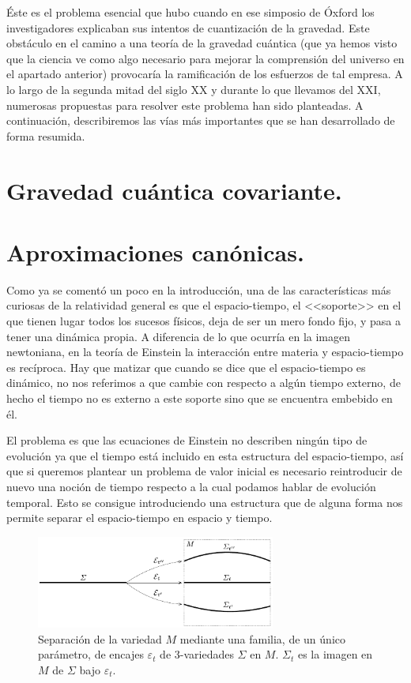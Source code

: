 \documentclass[11pt,a4paper,titlepage]{article}
\begin{document}
Éste es el problema esencial que hubo cuando en ese simposio de Óxford los investigadores explicaban sus intentos de cuantización de la gravedad. Este obstáculo en el camino a una teoría de la gravedad cuántica (que ya hemos visto que la ciencia ve como algo necesario para mejorar la comprensión del universo en el apartado anterior) provocaría la ramificación de los esfuerzos de tal empresa. A lo largo de la segunda mitad del siglo XX y durante lo que llevamos del XXI, numerosas propuestas para resolver este problema han sido planteadas. A continuación, describiremos las vías más importantes que se han desarrollado de forma resumida.
%
%
%
%
\newpage
\section{Gravedad cuántica covariante.} %

%
%
%
%
\newpage
\section{Aproximaciones canónicas.} %

Como ya se comentó un poco en la introducción, una de las características más curiosas de la relatividad general es que el espacio-tiempo, el <<soporte>> en el que tienen lugar todos los sucesos físicos, deja de ser un mero fondo fijo, y pasa a tener una dinámica propia. A diferencia de lo que ocurría en la imagen newtoniana, en la teoría de Einstein la interacción entre materia y espacio-tiempo es recíproca. Hay que matizar que cuando se dice que el espacio-tiempo es dinámico, no nos referimos a que cambie con respecto a algún tiempo externo, de hecho el tiempo no es externo a este soporte sino que se encuentra embebido en él.

El problema es que las ecuaciones de Einstein no describen ningún tipo de evolución ya que el tiempo está incluido en esta estructura del espacio-tiempo, así que si queremos plantear un problema de valor inicial es necesario reintroducir de nuevo una noción de tiempo respecto a la cual podamos hablar de evolución temporal. Esto se consigue introduciendo una estructura que de alguna forma nos permite separar el espacio-tiempo en espacio y tiempo.

\begin{figure}[ht]
\centering
\includegraphics[width=0.7\textwidth]{FoilM.png}
\caption{Separación de la variedad $M$ mediante una familia, de un único parámetro, de encajes $\varepsilon_t$ de 3-variedades $\Sigma$ en $M$. $\Sigma_t$ es la imagen en $M$ de $\Sigma$ bajo $\varepsilon_t$.}
\label{fig:FoilM}
\end{figure}
\end{document}
